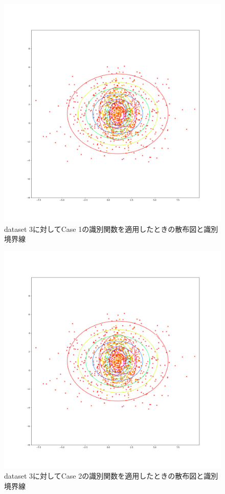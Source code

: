 \documentclass[class=jsarticle, crop=false, dvipdfmx, fleqn]{standalone}
\begin{document}
\begin{figure}
    \centering
    \includegraphics[clip, width=\linewidth]{../figures/result_assignment1_dataset3_case1.png}
    \caption{dataset 3に対してCase 1の識別関数を適用したときの散布図と識別境界線}
    \label{fig:result_dataset3_case1}
\end{figure}

\begin{figure}
    \centering
    \includegraphics[clip, width=\linewidth]{../figures/result_assignment1_dataset3_case2.png}
    \caption{dataset 3に対してCase 2の識別関数を適用したときの散布図と識別境界線}
    \label{fig:result_dataset3_case2}
\end{figure}
\end{document}

